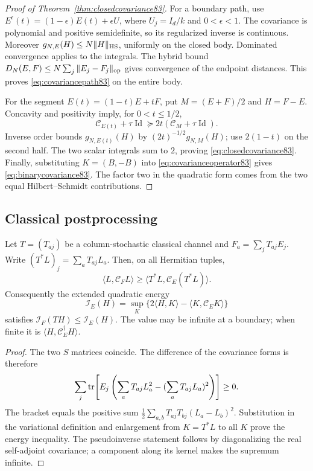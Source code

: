 \begin{proof}[Proof of Theorem~\ref{thm:closedcovariance83}]
For a boundary path, use $E^\epsilon(t)=(1-\epsilon)E(t)+\epsilon U$,
where $U_j=I_d/k$ and $0<\epsilon<1$.  The covariance is polynomial
and positive semidefinite, so its regularized inverse is continuous.
Moreover $g_{N,E}(H)\le N\|H\|_{\rm HS}$, uniformly on the closed
body.  Dominated convergence applies to the integrals.  The hybrid
bound $D_N(E,F)\le N\sum_j\|E_j-F_j\|_{\rm op}$ gives convergence
of the endpoint distances.  This proves \eqref{eq:covariancepath83}
on the entire body.

For the segment $E(t)=(1-t)E+tF$, put $M=(E+F)/2$ and $H=F-E$.
Concavity and positivity imply, for $0<t\le1/2$,
\[
 \mathcal C_{E(t)}+\tau\operatorname{Id}
 \succeq2t(\mathcal C_M+\tau\operatorname{Id}).
\]
Inverse order bounds $g_{N,E(t)}(H)$ by $(2t)^{-1/2}g_{N,M}(H)$;
use $2(1-t)$ on the second half.  The two scalar integrals sum to
$2$, proving \eqref{eq:closedcovariance83}.  Finally, substituting
$K=(B,-B)$ into \eqref{eq:covarianceoperator83} gives
\eqref{eq:binarycovariance83}.  The factor two in the quadratic form
comes from the two equal Hilbert--Schmidt contributions.
\end{proof}

\subsection{Classical postprocessing}

\begin{proposition}
\label{prop:covarianceprocessing83}
Let $T=(T_{aj})$ be a column-stochastic classical channel and
$F_a=\sum_jT_{aj}E_j$.  Write $(T^*L)_j=\sum_aT_{aj}L_a$.
Then, on all Hermitian tuples,
\begin{equation}\label{eq:covarianceprocessing83}
 \langle L,\mathcal C_FL\rangle
 \ge\langle T^*L,\mathcal C_E(T^*L)\rangle.
\end{equation}
Consequently the extended quadratic energy
\[
 \mathcal I_E(H)=\sup_K
       \{2\langle H,K\rangle-\langle K,\mathcal C_EK\rangle\}
\]
satisfies $\mathcal I_F(TH)\le\mathcal I_E(H)$.  The value may be
infinite at a boundary; when finite it is
$\langle H,\mathcal C_E^\dagger H\rangle$.
\end{proposition}
\begin{proof}
The two $S$ matrices coincide.  The difference of the covariance
forms is therefore
\[
 \sum_j\operatorname{tr}\!\left[E_j\left(\sum_aT_{aj}L_a^2
                   -(\sum_aT_{aj}L_a)^2\right)\right]\ge0.
\]
The bracket equals the positive sum
$\tfrac12\sum_{a,b}T_{aj}T_{bj}(L_a-L_b)^2$.
Substitution in the variational definition and enlargement from
$K=T^*L$ to all $K$ prove the energy inequality.  The pseudoinverse
statement follows by diagonalizing the real self-adjoint covariance;
a component along its kernel makes the supremum infinite.
\end{proof}

